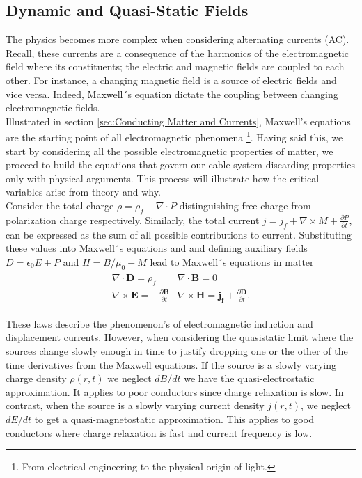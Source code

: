 \label{sec:Quasistatic Fields}
\subsection{Dynamic and Quasi-Static Fields}
The physics becomes more complex when considering alternating currents (AC). Recall, these currents are a consequence of the harmonics of the electromagnetic field where its constituents; the electric and magnetic fields are coupled to each other. For instance, a changing magnetic field is a source of electric fields and vice versa. Indeed, Maxwell´s equation dictate the coupling between changing electromagnetic fields. 
\\

Illustrated in section \ref{sec:Conducting Matter and Currents}, Maxwell's equations are the starting point of all electromagnetic phenomena \footnote{From electrical engineering to the physical origin of light.}. Having said this, we start by considering all the possible electromagnetic properties of matter, we proceed to build the equations that govern our cable system discarding properties only with physical arguments. This process will illustrate how the critical variables arise from theory and why.   
\\

Consider the total charge $\rho= \rho_f - \nabla \cdot P$ distinguishing free charge from polarization charge respectively. Similarly, the total current $j = j_f + \nabla \times M + \frac{\partial P}{\partial t}$, can be expressed as the sum of all possible contributions to current. Substituting these values into Maxwell´s equations and and defining auxiliary fields $D=\epsilon_0 E + P$ and $H = B/\mu_0 -M$ lead to Maxwell´s equations in matter
\begin{equation}
\begin{aligned}
    \begin{array}{cc}
    \nabla \cdot \mathbf{D} = \rho_f & \nabla \cdot \mathbf{B} = 0 \\
    \nabla \times \mathbf{E} = -\frac{\partial \mathbf{B}}{\partial t} & \nabla \times \mathbf{H} = \mathbf{j_f} + \frac{\partial \mathbf{D}}{\partial t}.
    \end{array}
\end{aligned}
\end{equation}

These laws describe the phenomenon's of electromagnetic induction and displacement currents. However, when considering the quasistatic limit where the sources change slowly enough in time to justify dropping one or the other of the time derivatives from the Maxwell equations. If the source is a slowly varying charge density $\rho(r,t)$ we neglect $dB/dt$ we have the quasi-electrostatic approximation. It applies to poor conductors since charge relaxation is slow. In contrast, when the source is a slowly varying current density $j(r, t)$, we neglect $dE/dt$ to get a quasi-magnetostatic approximation. This applies to good conductors where charge relaxation is fast and current frequency is low. \\

